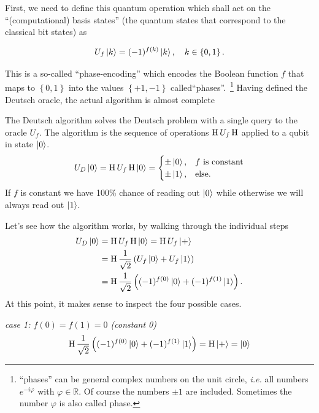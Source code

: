 First, we need to define this quantum operation which shall act on the ``(computational) basis states'' (the quantum states that correspond to the classical bit states) as
\begin{def*}
\begin{align}
    U_f \ket{k} = (-1)^{f(k)} \ket{k}, \quad k \in \left\{0,1\right\}.
\end{align}
\end{def*}
This is a so-called ``phase-encoding'' which encodes the Boolean function $f$ that maps to $\left\{0,1\right\}$ into the values $\left\{+1,-1\right\}$ called``phases''.~\footnote{``phases'' can be general complex numbers on the unit circle, \textit{i.e.} all numbers $e^{-i\varphi }$ with $\varphi \in \mathbb{R}$. Of course the numbers $\pm 1$ are included. Sometimes the number $\varphi$ is also called phase.} 
Having defined the Deutsch oracle, the actual algorithm is almost complete
\begin{algo*}
The Deutsch algorithm solves the Deutsch problem with a single query to the oracle $U_f$. The algorithm is the sequence of operations $\operatorname{H} U_f \operatorname{H}$ applied to a qubit in state $\ket{0}$.
\begin{align}
    U_D \ket{0} = \operatorname{H} U_f \operatorname{H} \ket{0} = \begin{cases}
        \pm\ket{0}, & f\text{ is constant}\\
        \pm\ket{1}, & \text{else}.
    \end{cases}
\end{align}
If $f$ is constant we have 100\% chance of reading out $\ket{0}$ while otherwise we will always read out $\ket{1}$.
\end{algo*}
Let's see how the algorithm works, by walking through the individual steps
\begin{align}
    U_D \ket{0} &= \operatorname{H} U_f \operatorname{H} \ket{0} = \operatorname{H} U_f \ket{+}\nonumber\\
    &= \operatorname{H} \frac{1}{\sqrt{2}}\left(U_f\ket{0} + U_f\ket{1} \right) \nonumber\\
    &= \operatorname{H} \frac{1}{\sqrt{2}} \left((-1)^{f(0)}\ket{0} + (-1)^{f(1)}\ket{1}\right).
\end{align}
At this point, it makes sense to inspect the four possible cases.

\textit{case 1: $f(0)=f(1)=0$ (constant 0)} 
\begin{align}
    \operatorname{H} \frac{1}{\sqrt{2}} \left((-1)^{f(0)}\ket{0} + (-1)^{f(1)}\ket{1}\right) = \operatorname{H} \ket{+} = \ket{0}
\end{align}

